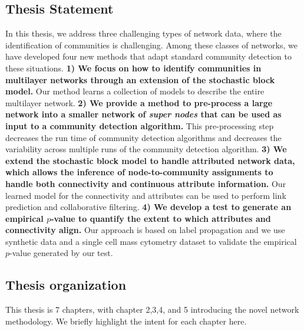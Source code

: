 \subsection{Thesis Statement}
In this thesis, we address three challenging types of network data,  where the identification of communities is challenging. Among these classes of networks, we have developed four new methods that adapt standard community detection to these situations. {\bf 1) We focus on how to identify communities in multilayer networks through an extension of the stochastic block model.} Our method learns a collection of models to describe the entire multilayer network. {\bf 2) We provide a method to pre-process a large network into a smaller network of \emph{super nodes} that can be used as input to a community detection algorithm.} This pre-processing step decreases the run time of community detection algorithms and decreases the variability across multiple runs of the community detection algorithm. {\bf 3) We extend the stochastic block model to handle attributed network data, which allows the inference of node-to-community assignments to handle both connectivity and continuous attribute information.} Our learned model for the connectivity and attributes can be used to perform link prediction and collaborative filtering.  {\bf 4) We develop a test to generate an empirical $p$-value to quantify the extent to which attributes and connectivity align.} Our approach is based on label propagation and we use synthetic data and a single cell mass cytometry dataset to validate the empirical $p$-value generated by our test.

\subsection{Thesis organization}
This thesis is 7 chapters, with chapter 2,3,4, and 5 introducing the novel network methodology. We briefly highlight the intent for each chapter here.

